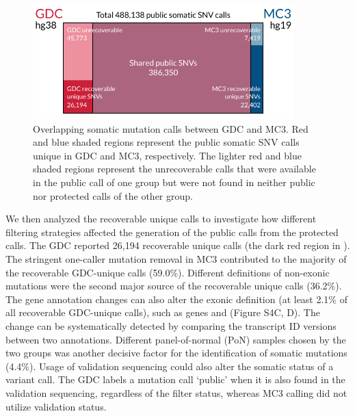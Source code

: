 \begin{figure}[tb]
    \centering
    \includegraphics[width=0.9\textwidth]{figures/chap02_mutation_pipeline_qc/overlap_venn_diagram.pdf}
    \caption[Overlapping somatic mutation calls between GDC and MC3.]{Overlapping somatic mutation calls between GDC and MC3. Red and blue shaded regions represent the public somatic SNV calls unique in GDC and MC3, respectively. The lighter red and blue shaded regions represent the unrecoverable calls that were available in the public call of one group but were not found in neither public nor protected calls of the other group.}
    \label{fig:mut-call-qc-venn-diagram}
\end{figure}

We then analyzed the recoverable unique calls to investigate how different filtering strategies affected the generation of the public calls from the protected calls. The GDC reported 26,194 recoverable unique calls (the dark red region in ). The stringent one-caller mutation removal in MC3 contributed to the majority of the recoverable GDC-unique calls (59.0\%). Different definitions of non-exonic mutations were the second major source of the recoverable unique calls (36.2\%). The gene annotation changes can also alter the exonic definition (at least 2.1\% of all recoverable GDC-unique calls), such as genes  and  (Figure S4C, D). The change can be systematically detected by comparing the transcript ID versions between two annotations. Different panel-of-normal (PoN) samples chosen by the two groups was another decisive factor for the identification of somatic mutations (4.4\%). Usage of validation sequencing could also alter the somatic status of a variant call. The GDC labels a mutation call `public' when it is also found in the validation sequencing, regardless of the filter status, whereas MC3 calling did not utilize validation status.

